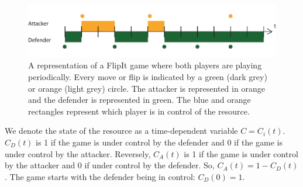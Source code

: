 \begin{figure}[hbtp]
\centering
\includegraphics[scale=0.7]{../../doc/template/Images/FlipBasic}
\caption{A representation of a FlipIt game where both players are playing periodically. Every move or flip is indicated by a green (dark grey) or orange (light grey) circle. The attacker is represented in orange and the defender is represented in green. The blue and orange rectangles represent which player is in control of the resource.}
\label{fig:FLipItDefault}
\end{figure}



We denote the state of the resource as a time-dependent variable $C=C_{i}(t)$. 
$C_{D}(t)$ is 1 if the game is under control by the defender and 0 if the game is under control by the attacker. Reversely, $C_{A}(t)$ is 1 if the game is under control by the attacker and 0 if under control by the defender. So, $C_{A}(t)= 1 - C_{D}(t)$.
The game starts with the defender being in control: $C_{D}(0)= 1$. \\



